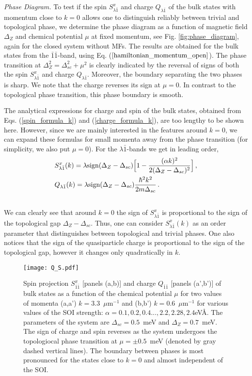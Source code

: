 \documentclass[prl,twocolumn,showpacs,floatfix,amsbsy,amsbsy,superscriptaddress]{revtex4-1}
\begin{document}
\emph{Phase Diagram.}
To test if the spin $S^x_{\lambda\bar1}$ and charge $Q_{\lambda\bar1}$ of the bulk states with momentum close to $k=0$ allows one to distinguish reliably between trivial and topological phase, we determine the phase diagram as a function of magnetic field $\Delta_Z$ and chemical potential $\mu$ at fixed momentum, see Fig. \ref{fig:phase_diagram}, again for the closed system without MFs.  The results are obtained for the bulk states from the $\bar 1 \bar 1$-band, using 
 Eq.  ($\ref{hamiltonian_momentum_open}$).
The phase transition at $\Delta_Z^2=\Delta_{sc}^2+\mu^2$ is clearly indicated by the reversal of signs of both the spin $S^x_{\lambda\bar1}$ and charge $Q_{\lambda\bar1}$.  Moreover, the boundary separating the two phases is sharp.
We note that the charge reverses its sign at  $\mu=0$. In contrast to the topological phase transition, this phase boundary is smooth.

The analytical expressions for charge and spin of the bulk states, obtained from Eqs. (\ref{spin_formula_k}) and (\ref{charge_formula_k}), are too lengthy to be shown here.  However, since we are mainly interested in the features around $k=0$, we can expand these formulas for small momenta away from the phase transition (for simplicity, we also put $\mu=0$).
 For the $\lambda\bar1$-bands we get in leading order,
\begin{align}
&S^x_{\lambda\bar 1}(k)=\lambda\textrm{sign}(\Delta_Z-\Delta_{sc})\Big[1-\frac{(\alpha k)^2}{2(\Delta_Z-\Delta_{sc})^2}\Big] \label{spin_analytic}\, ,\\
&Q_{\lambda\bar 1}(k)=\lambda\textrm{sign}(\Delta_Z-\Delta_{sc})\frac{\hbar^2k^2}{2m\Delta_{sc}}\label{charge_analytic}\, .\\\notag
\end{align}
We can clearly see that around $k=0$ the sign of $S^x_{\lambda\bar 1}$
is proportional to the sign of the topological gap $\Delta_Z-\Delta_{sc}$.
Thus, one can consider $S^x_{\lambda\bar 1}(k)$  as an order parameter that distinguishes between topological and trivial phases.  One also notices that the sign of the quasiparticle charge is proportional to the sign of the topological gap, however it changes only quadratically in $k$. 


\begin{figure}[b]
\texttt{[image: Q\_S.pdf]}
\caption{
Spin projection $S^x_{\bar1\bar 1}$ [panels (a,b)] and charge $Q_{\bar1\bar 1}$  [panels (a',b')] of bulk states as a function of the chemical potential $\mu$ for two values of momenta (a,a') $k=3.3$~$\mu$m$^{-1}$ and (b,b') $k=0.6$~$\mu$m$^{-1}$ for various values of the SOI strength: $\alpha=0.1, 0.2, 0.4 ...,2.2, 2.28, 2.4$eV\AA. 
The parameters of the system are $\Delta_{sc}=0.5$~meV and $\Delta_Z=0.7$~meV.
The sign of charge and spin reverses as the system undergoes the topologiocal phase transition at $\mu=\pm 0.5$~meV (denoted by gray dashed vertical lines). The boundary between phases is most pronounced for the states close to $k=0$ and almost independent of the SOI.}
  \label{fig:Q_S(a_mu)_without_map}
\end{figure}
\end{document}
